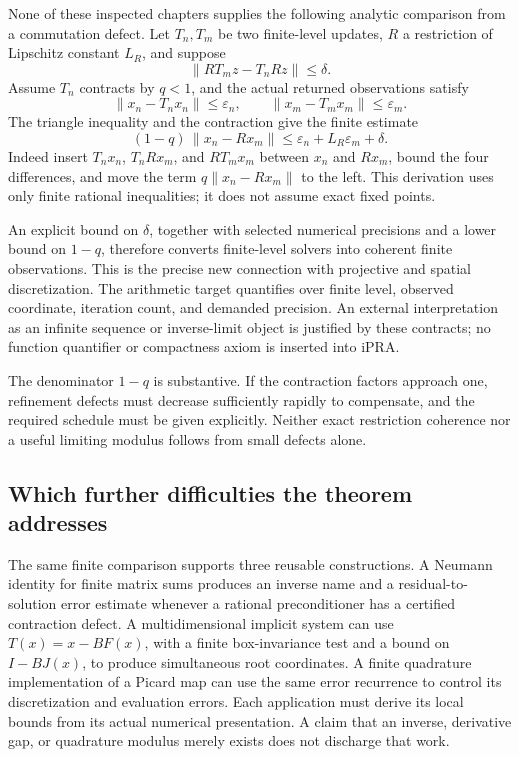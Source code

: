 None of these inspected chapters supplies the following analytic comparison
from a commutation defect. Let \(T_n,T_m\) be two finite-level updates,
\(R\) a restriction of Lipschitz constant \(L_R\), and suppose
\[
 \|RT_m z-T_n Rz\|\le\delta .
\]
Assume \(T_n\) contracts by \(q<1\), and the actual returned observations
satisfy
\[
 \|x_n-T_nx_n\|\le\varepsilon_n,\qquad
 \|x_m-T_mx_m\|\le\varepsilon_m .
\]
The triangle inequality and the contraction give the finite estimate
\[
 (1-q)\,\|x_n-Rx_m\|
       \le
       \varepsilon_n+L_R\varepsilon_m+\delta .
\]
Indeed insert \(T_nx_n\), \(T_nRx_m\), and \(RT_mx_m\)
between \(x_n\) and \(Rx_m\), bound the four differences, and move the
term \(q\|x_n-Rx_m\|\) to the left. This derivation uses only
finite rational inequalities; it does not assume exact fixed points.

An explicit bound on \(\delta\), together with selected numerical
precisions and a lower bound on \(1-q\), therefore converts finite-level
solvers into coherent finite observations. This is the precise new
connection with projective and spatial discretization.
The arithmetic target quantifies over finite level, observed coordinate,
iteration count, and demanded precision. An external interpretation as an
infinite sequence or inverse-limit object is justified by these contracts;
no function quantifier or compactness axiom is inserted into iPRA.

The denominator \(1-q\) is substantive. If the contraction factors
approach one, refinement defects must decrease sufficiently rapidly to
compensate, and the required schedule must be given explicitly.
Neither exact restriction coherence nor a useful limiting modulus follows
from small defects alone.

\subsection{Which further difficulties the theorem addresses}

The same finite comparison supports three reusable constructions.
A Neumann identity for finite matrix sums produces an inverse name and
a residual-to-solution error estimate whenever a rational
preconditioner has a certified contraction defect.
A multidimensional implicit system can use
\(T(x)=x-BF(x)\), with a finite box-invariance test and a bound on
\(I-BJ(x)\), to produce simultaneous root coordinates.
A finite quadrature implementation of a Picard map can use the same
error recurrence to control its discretization and evaluation errors.
Each application must derive its local bounds from its actual numerical
presentation. A claim that an inverse, derivative gap, or quadrature
modulus merely exists does not discharge that work.

